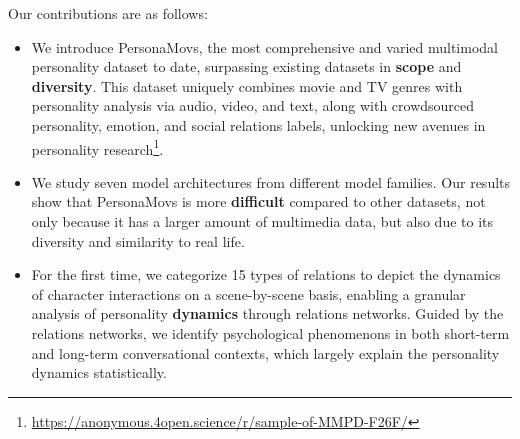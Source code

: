 Our contributions are as follows:
\begin{itemize}
  \item We introduce PersonaMovs, the most comprehensive and varied multimodal personality dataset to date, surpassing existing datasets in \textbf{scope} and \textbf{diversity}. This dataset uniquely combines movie and TV genres with personality analysis via audio, video, and text, along with crowdsourced personality, emotion, and social relations labels, unlocking new avenues in personality research\footnote[2]{\href{https://anonymous.4open.science/r/sample-of-MMPD-F26F}{https://anonymous.4open.science/r/sample-of-MMPD-F26F/}}.
  \item We study seven model architectures from different model families. Our results show that PersonaMovs is more \textbf{difficult} compared to other datasets, not only because it has a larger amount of multimedia data, but also due to its diversity and similarity to real life.
  \item For the first time, we categorize 15 types of relations to depict the dynamics of character interactions on a scene-by-scene basis, enabling a granular analysis of personality \textbf{dynamics} through relations networks. Guided by the relations networks, we identify psychological phenomenons in both short-term and long-term conversational contexts, which largely explain the personality dynamics statistically.
\end{itemize}



